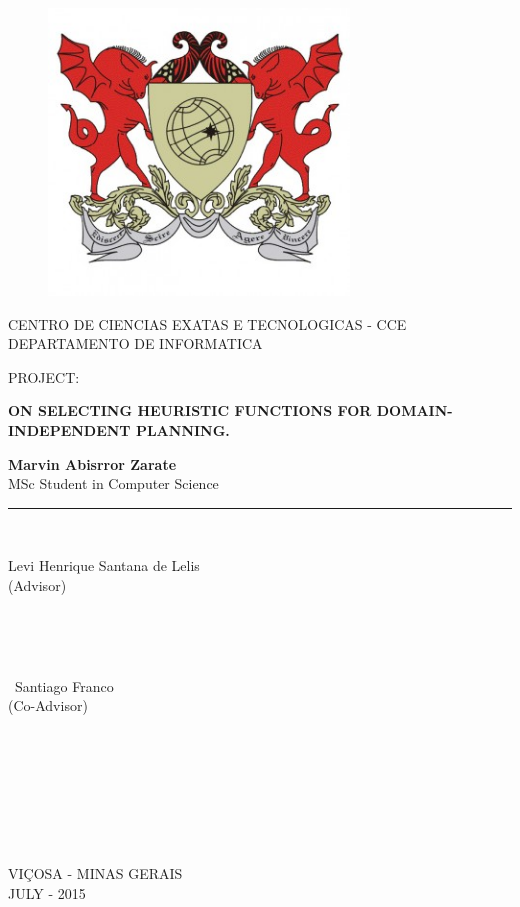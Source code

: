 \documentclass[a4paper,12pt]{article}
\begin{document}
\begin{titlepage}

\begin{center}
\vspace*{-1in}
\begin{figure}[htb]
\begin{center}
\includegraphics[width=8cm]{./image/ufv1}
\end{center}
\end{figure}

CENTRO DE CIENCIAS EXATAS E TECNOLOGICAS - CCE\\
\vspace*{0.15in}
DEPARTAMENTO DE INFORMATICA \\
\vspace*{0.6in}
\begin{large}
PROJECT:\\
\end{large}
\vspace*{0.2in}
\begin{Large}
\textbf{ON SELECTING HEURISTIC FUNCTIONS FOR DOMAIN-INDEPENDENT PLANNING.} \\
\end{Large}
\vspace*{0.3in}
\begin{large}
\textbf{Marvin Abisrror Zarate} \\
MSc Student in Computer Science \\
\end{large}
\vspace*{0.3in}
\rule{80mm}{0.1mm}\\
\vspace*{0.1in}
\begin{large}
Levi Henrique Santana de Lelis \\
(Advisor)
\

\

\

\
Santiago Franco \\
(Co-Advisor)
\

\

\

\

\
\end{large}
VIÇOSA - MINAS GERAIS\\
JULY - 2015
\end{center}
\end{titlepage}
\end{document}
